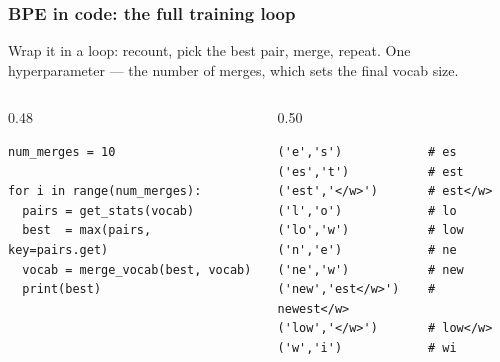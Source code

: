 \documentclass[aspectratio=169]{beamer}
\begin{document}
\begin{frame}[fragile]
\frametitle{BPE in code: the full training loop}
\vspace{-0.1cm}
{\small Wrap it in a loop: recount, pick the best pair, merge, repeat. One hyperparameter --- the number of merges, which sets the final vocab size.}

\vspace{0.15cm}
\begin{columns}[T]
\begin{column}{0.48\textwidth}
\begin{lstlisting}
num_merges = 10

for i in range(num_merges):
  pairs = get_stats(vocab)
  best  = max(pairs, key=pairs.get)
  vocab = merge_vocab(best, vocab)
  print(best)
\end{lstlisting}
\end{column}
\begin{column}{0.50\textwidth}
\begin{lstlisting}
('e','s')            # es
('es','t')           # est
('est','</w>')       # est</w>
('l','o')            # lo
('lo','w')           # low
('n','e')            # ne
('ne','w')           # new
('new','est</w>')    # newest</w>
('low','</w>')       # low</w>
('w','i')            # wi
\end{lstlisting}
\end{column}
\end{columns}

\vspace{0.15cm}
\begin{center}
\end{center}
\end{frame}
\end{document}
